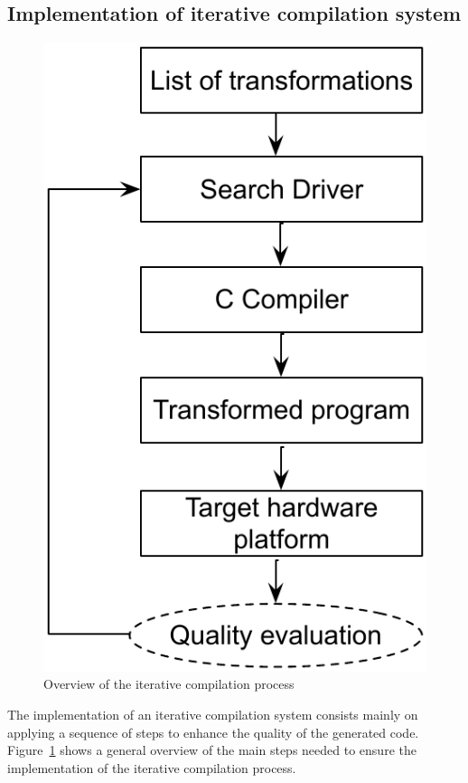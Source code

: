 \subsection{Implementation of iterative compilation system}
\begin{figure}[h]
	\center
	\includegraphics[scale=0.9]{SOTA/fig/iterative_compilation}
	\caption{Overview of the iterative compilation process}
	\label{fig:iterative_compilation}
\end{figure}
The implementation of an iterative compilation system consists mainly on applying a sequence of steps to enhance the quality of the generated code. Figure~\ref{fig:iterative_compilation} shows a general overview of the main steps needed to ensure the implementation of the iterative compilation process.
